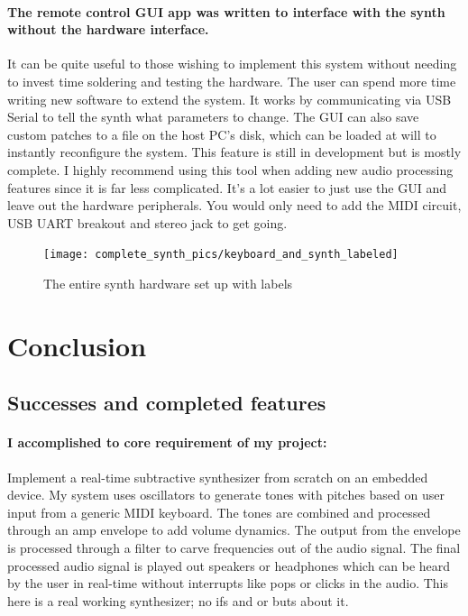 \documentclass[acmlarge,screen]{acmart}
\begin{document}
	\paragraph{The remote control GUI app was written to interface with the synth without the hardware interface.} It can be quite useful to those wishing to implement this system without needing to invest time soldering and testing the hardware. The user can spend more time writing new software to extend the system. It works by communicating via USB Serial to tell the synth what parameters to change. The GUI can also save custom patches to a file on the host PC's disk, which can be loaded at will to instantly reconfigure the system. This feature is still in development but is mostly complete. I highly recommend using this tool when adding new audio processing features since it is far less complicated. It's a lot easier to just use the GUI and leave out the hardware peripherals. You would only need to add the MIDI circuit, USB UART breakout and stereo jack to get going.

	\begin{figure}[H]
		\texttt{[image: complete\_synth\_pics/keyboard\_and\_synth\_labeled]}
		\caption{The entire synth hardware set up with labels}
		\centering
	\end{figure}

\section{Conclusion}
	\subsection{Successes and completed features} 
	\paragraph{I accomplished to core requirement of my project:} Implement a real-time subtractive synthesizer from scratch on an embedded device. My system uses oscillators to generate tones with pitches based on user input from a generic MIDI keyboard. The tones are combined and processed through an amp envelope to add volume dynamics. The output from the envelope is processed through a filter to carve frequencies out of the audio signal. The final processed audio signal is played out speakers or headphones which can be heard by the user in real-time without interrupts like pops or clicks in the audio. This here is a real working synthesizer; no ifs and or buts about it.
	
\end{document}
